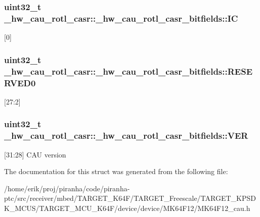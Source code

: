 \subsubsection[{\texorpdfstring{IC}{IC}}]{\setlength{\rightskip}{0pt plus 5cm}uint32\+\_\+t \+\_\+hw\+\_\+cau\+\_\+rotl\+\_\+casr\+::\+\_\+hw\+\_\+cau\+\_\+rotl\+\_\+casr\+\_\+bitfields\+::\+IC}\hypertarget{struct__hw__cau__rotl__casr_1_1__hw__cau__rotl__casr__bitfields_a523638e2ee735472333d5a7e7af53cd8}{}\label{struct__hw__cau__rotl__casr_1_1__hw__cau__rotl__casr__bitfields_a523638e2ee735472333d5a7e7af53cd8}
\mbox{[}0\mbox{]} 
\subsubsection[{\texorpdfstring{R\+E\+S\+E\+R\+V\+E\+D0}{RESERVED0}}]{\setlength{\rightskip}{0pt plus 5cm}uint32\+\_\+t \+\_\+hw\+\_\+cau\+\_\+rotl\+\_\+casr\+::\+\_\+hw\+\_\+cau\+\_\+rotl\+\_\+casr\+\_\+bitfields\+::\+R\+E\+S\+E\+R\+V\+E\+D0}\hypertarget{struct__hw__cau__rotl__casr_1_1__hw__cau__rotl__casr__bitfields_a36a0959e80923573e1e948787c3a0cd9}{}\label{struct__hw__cau__rotl__casr_1_1__hw__cau__rotl__casr__bitfields_a36a0959e80923573e1e948787c3a0cd9}
\mbox{[}27\+:2\mbox{]} 
\subsubsection[{\texorpdfstring{V\+ER}{VER}}]{\setlength{\rightskip}{0pt plus 5cm}uint32\+\_\+t \+\_\+hw\+\_\+cau\+\_\+rotl\+\_\+casr\+::\+\_\+hw\+\_\+cau\+\_\+rotl\+\_\+casr\+\_\+bitfields\+::\+V\+ER}\hypertarget{struct__hw__cau__rotl__casr_1_1__hw__cau__rotl__casr__bitfields_af0571a83ee156a6917b8d84ba4718944}{}\label{struct__hw__cau__rotl__casr_1_1__hw__cau__rotl__casr__bitfields_af0571a83ee156a6917b8d84ba4718944}
\mbox{[}31\+:28\mbox{]} C\+AU version 

The documentation for this struct was generated from the following file\+:\begin{DoxyCompactItemize}
\item 
/home/erik/proj/piranha/code/piranha-\/ptc/src/receiver/mbed/\+T\+A\+R\+G\+E\+T\+\_\+\+K64\+F/\+T\+A\+R\+G\+E\+T\+\_\+\+Freescale/\+T\+A\+R\+G\+E\+T\+\_\+\+K\+P\+S\+D\+K\+\_\+\+M\+C\+U\+S/\+T\+A\+R\+G\+E\+T\+\_\+\+M\+C\+U\+\_\+\+K64\+F/device/device/\+M\+K64\+F12/M\+K64\+F12\+\_\+cau.\+h\end{DoxyCompactItemize}
